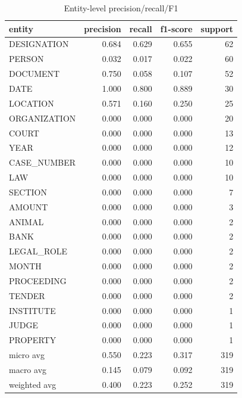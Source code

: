 \begin{table}
\caption{Entity-level precision/recall/F1}
\label{tab:ner_results}
\begin{tabular}{lrrrr}
\toprule
entity & precision & recall & f1-score & support \\
\midrule
DESIGNATION & 0.684 & 0.629 & 0.655 & 62 \\
PERSON & 0.032 & 0.017 & 0.022 & 60 \\
DOCUMENT & 0.750 & 0.058 & 0.107 & 52 \\
DATE & 1.000 & 0.800 & 0.889 & 30 \\
LOCATION & 0.571 & 0.160 & 0.250 & 25 \\
ORGANIZATION & 0.000 & 0.000 & 0.000 & 20 \\
COURT & 0.000 & 0.000 & 0.000 & 13 \\
YEAR & 0.000 & 0.000 & 0.000 & 12 \\
CASE\_NUMBER & 0.000 & 0.000 & 0.000 & 10 \\
LAW & 0.000 & 0.000 & 0.000 & 10 \\
SECTION & 0.000 & 0.000 & 0.000 & 7 \\
AMOUNT & 0.000 & 0.000 & 0.000 & 3 \\
ANIMAL & 0.000 & 0.000 & 0.000 & 2 \\
BANK & 0.000 & 0.000 & 0.000 & 2 \\
LEGAL\_ROLE & 0.000 & 0.000 & 0.000 & 2 \\
MONTH & 0.000 & 0.000 & 0.000 & 2 \\
PROCEEDING & 0.000 & 0.000 & 0.000 & 2 \\
TENDER & 0.000 & 0.000 & 0.000 & 2 \\
INSTITUTE & 0.000 & 0.000 & 0.000 & 1 \\
JUDGE & 0.000 & 0.000 & 0.000 & 1 \\
PROPERTY & 0.000 & 0.000 & 0.000 & 1 \\
micro avg & 0.550 & 0.223 & 0.317 & 319 \\
macro avg & 0.145 & 0.079 & 0.092 & 319 \\
weighted avg & 0.400 & 0.223 & 0.252 & 319 \\
\bottomrule
\end{tabular}
\end{table}
